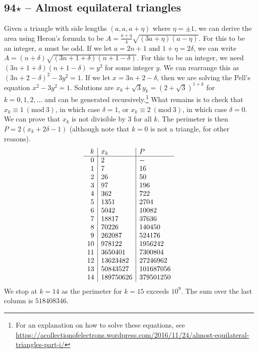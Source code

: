 \documentclass{article}
\newcommand{\Mod}[1]{\ (\mathrm{mod}\ #1)}
\begin{document}
\subsection*{94$\star$ -- Almost equilateral triangles} 
Given a triangle with side lengths $(a, a, a+\eta)$ where $\eta = \pm 1$, we can derive the area using Heron's formula to be $A = \frac{a+\eta}{4}\sqrt{(3a+\eta)(a-\eta)}$. 
For this to be an integer, $a$ must be odd.
If we let $a = 2n+1$ and $1 + \eta = 2 \delta$, we can write $A = (n+\delta) \sqrt{ (3n + 1 + \delta)(n + 1 - \delta)}$.
For this to be an integer, we need $(3n + 1 + \delta)(n + 1 - \delta) = y^2$ for some integer $y$.
We can rearrange this as $(3n + 2 - \delta)^2 - 3y^2 = 1$. 
If we let $x = 3n + 2 - \delta$, then we are solving the Pell's equation $x^2 - 3y^2 = 1$. 
Solutions are $x_k + \sqrt{3} y_k = (2+\sqrt{3})^{1+k}$ for $k = 0, 1, 2, \dotsc$ and can be generated recursively.\footnote{For an explanation on how to solve these equations, see \url{https://acollectionofelectrons.wordpress.com/2016/11/24/almost-equilateral-triangles-part-i/}}
What remains is to check that $x_k \equiv 1 \Mod 3$, in which case $\delta = 1$, or $x_k \equiv 2 \Mod 3$, in which case $\delta = 0$. 
We can prove that $x_k$ is not divisible by 3 for all $k$. 
The perimeter is then $P = 2(x_k + 2\delta - 1)$ (although note that $k=0$ is not a triangle, for other reasons).
\begin{align*}
	\begin{array}{r | l | l }
	k & x_k & P \\ \hline
	0 & 2 & - \\ 
	1 & 7 & 16 \\  
	2 & 26 & 50 \\ 
	3 & 97 & 196 \\ 
	4 & 362 & 722 \\ 
	5 & 1351 & 2704 \\ 
	6 & 5042 & 10082 \\ 
	7 & 18817 & 37636 \\ 
	8 & 70226 & 140450 \\ 
	9 & 262087 & 524176 \\ 
	10 & 978122 & 1956242 \\ 
	11 & 3650401 & 7300804 \\ 
	12 & 13623482 & 27246962 \\ 
	13 & 50843527 & 101687056 \\ 
	14 & 189750626 & 379501250 
	\end{array}
\end{align*}
We stop at $k=14$ as the perimeter for $k=15 $ exceeds $10^9$.
The sum over the last column is $\boxed{518408346}$.
\end{document}
